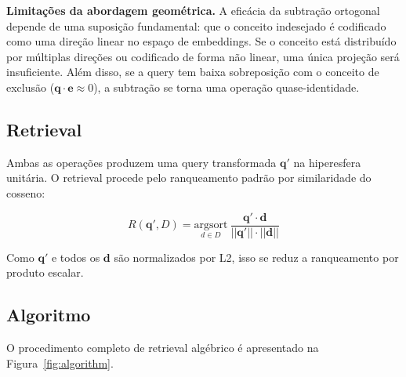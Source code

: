 \documentclass{article}
\begin{document}
\textbf{Limitações da abordagem geométrica.} A eficácia da subtração ortogonal depende de uma suposição fundamental: que o conceito indesejado é codificado como uma direção linear no espaço de embeddings. Se o conceito está distribuído por múltiplas direções ou codificado de forma não linear, uma única projeção será insuficiente. Além disso, se a query tem baixa sobreposição com o conceito de exclusão ($\mathbf{q} \cdot \mathbf{e} \approx 0$), a subtração se torna uma operação quase-identidade.

\subsection{Retrieval}

Ambas as operações produzem uma query transformada $\mathbf{q}'$ na hiperesfera unitária. O retrieval procede pelo ranqueamento padrão por similaridade do cosseno:

\begin{equation}
R(\mathbf{q}', D) = \underset{d \in D}{\text{argsort}} \ \frac{\mathbf{q}' \cdot \mathbf{d}}{||\mathbf{q}'|| \cdot ||\mathbf{d}||}
\end{equation}

Como $\mathbf{q}'$ e todos os $\mathbf{d}$ são normalizados por L2, isso se reduz a ranqueamento por produto escalar.

\subsection{Algoritmo}

O procedimento completo de retrieval algébrico é apresentado na Figura~\ref{fig:algorithm}.
\end{document}
